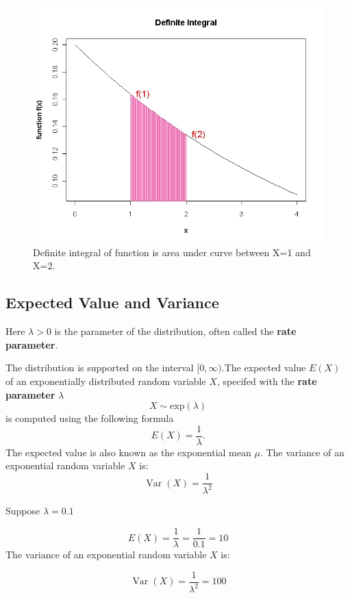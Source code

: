 \documentclass[a4paper,12pt]{article}
\begin{document}
\begin{figure}[h!]
\centering
\includegraphics[width=0.5\linewidth]{images/6ADefiniteIntegral}
\caption{Definite integral of function is area under curve between X=1 and X=2.}
\label{fig:6adefiniteintegral}
\end{figure}



\subsection*{Expected Value and Variance}

Here $\lambda > 0$ is the parameter of the distribution, often called the \textbf{rate parameter}. 

The distribution is supported on the interval $[0, \infty)$.The expected value $E(X)$ of an exponentially distributed random variable $X$, specifed with the \textbf{rate parameter} $\lambda$
\[ X \sim \mbox{exp}(\lambda)  \]
is computed using the following formula
\[ E(X) = \frac{1}{\lambda}. \]
The expected value is also known as the exponential mean $\mu$.
\smallskip
\noindent The variance of an exponential random variable $X$ is:
\[\operatorname{Var}(X) = \frac{1}{\lambda^2}\]

\noindent Suppose $\lambda=0.1$


\[
E(X) = \frac{1}{\lambda} = \frac{1}{0.1} = 10 \]
The variance of an exponential random variable $X$ is:

\[\operatorname{Var}(X) = \frac{1}{\lambda^2} = 100\]





\end{document}
